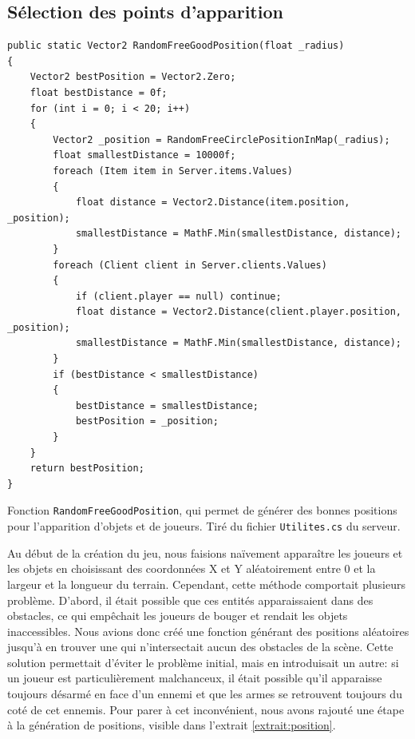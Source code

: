\documentclass[a4paper]{article}
\begin{document}
\subsection{Sélection des points d'apparition}
\begin{listing}[H]
\begin{verbatim}
public static Vector2 RandomFreeGoodPosition(float _radius)
{
    Vector2 bestPosition = Vector2.Zero;
    float bestDistance = 0f;
    for (int i = 0; i < 20; i++)
    {
        Vector2 _position = RandomFreeCirclePositionInMap(_radius);
        float smallestDistance = 10000f;
        foreach (Item item in Server.items.Values)
        {
            float distance = Vector2.Distance(item.position, _position);
            smallestDistance = MathF.Min(smallestDistance, distance);
        }
        foreach (Client client in Server.clients.Values)
        {
            if (client.player == null) continue;
            float distance = Vector2.Distance(client.player.position, _position);
            smallestDistance = MathF.Min(smallestDistance, distance);
        }
        if (bestDistance < smallestDistance)
        {
            bestDistance = smallestDistance;
            bestPosition = _position;
        }
    }
    return bestPosition;
}
\end{verbatim}
\caption{Fonction \texttt{RandomFreeGoodPosition}, qui permet de générer des bonnes positions pour l'apparition d'objets et de joueurs. Tiré du fichier  \texttt{Utilites.cs} du serveur.}
\label{extrait:position}
\end{listing}
\noindent
Au début de la création du jeu, nous faisions naïvement apparaître les joueurs et les objets en choisissant des coordonnées X et Y aléatoirement entre 0 et la largeur et la longueur du terrain. Cependant, cette méthode comportait plusieurs problème. D'abord, il était possible que ces entités apparaissaient dans des obstacles, ce qui empêchait les joueurs de bouger et rendait les objets inaccessibles. Nous avions donc créé une fonction générant des positions aléatoires jusqu'à en trouver une qui n'intersectait aucun des obstacles de la scène. Cette solution permettait d'éviter le problème initial, mais en introduisait un autre: si un joueur est particulièrement malchanceux, il était possible qu'il apparaisse toujours désarmé en face d'un ennemi et que les armes se retrouvent toujours du coté de cet ennemis. Pour parer à cet inconvénient, nous avons rajouté une étape à la génération de positions, visible dans l'extrait \ref{extrait:position}. \\
\end{document}
